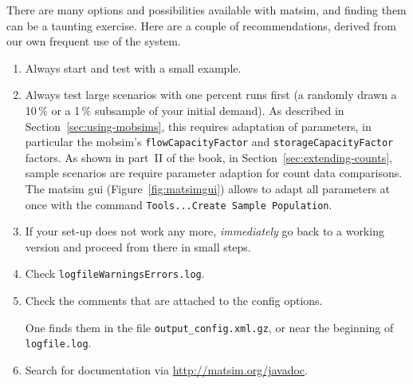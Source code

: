 


There are many options and possibilities available with \gls{matsim}, and finding them can be a taunting exercise.  Here are a couple of recommendations, derived from our own frequent use of the system.
\begin{enumerate}\styleEnumerate

\item Always start and test with a small example.

\item Always test large scenarios with one percent runs first (\eg a randomly drawn a 10\,\% or a 1\,\% subsample of your initial demand). As described in Section~\ref{sec:using-mobsims}, this requires adaptation of parameters, in particular the \gls{mobsim}'s \lstinline|flowCapacityFactor| and \lstinline|storageCapacityFactor| factors. As shown in part~II of the book, in Section~\ref{sec:extending-counts}, sample scenarios are require parameter adaption for count data comparisons. The \gls{matsim} \gls{gui} (Figure~\ref{fig:matsimgui}) allows to adapt all parameters at once with the command \lstinline|Tools...Create Sample Population|. %

\item If your set-up does not work any more, \emph{immediately} go back to a working version and proceed from there in small steps.

\item Check \lstinline{logfileWarningsErrors.log}.

\item Check the comments that are attached to the config options.

  One finds them in the file \lstinline{output_config.xml.gz}, or near the beginning of \lstinline{logfile.log}.

\item Search for documentation via \url{http://matsim.org/javadoc}.

\end{enumerate}

